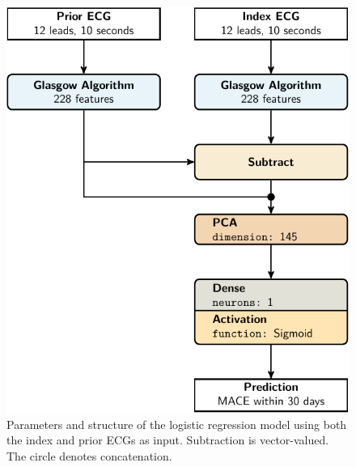 \documentclass[preprint]{elsarticle}
\begin{document}
\begin{figure}[H]
\centering
\includegraphics[scale=\modelscale,keepaspectratio,trim=0 0 -16em 0]{figures/model-lr2.pdf}
\caption{Parameters and structure of the logistic regression model using both the index and prior ECGs as input. Subtraction is vector-valued. The circle denotes concatenation.}
\end{figure}
\end{document}
